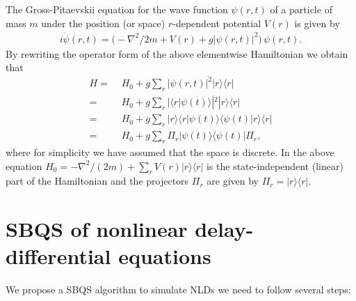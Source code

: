 \documentclass[aps,pra,twocolumn,floatfix,groupedaddress,superscriptaddress,nofootinbib,notitlepage]{revtex4-2}
\begin{document}
The Gross-Pitaevskii equation for the wave function $\psi(r,t)$ of a particle of mass $m$ under the position (or space) $r$-dependent potential $V(r)$ is given by 
\begin{align}
i\dot{\psi}(r,t)= \big(-\nabla^{2}/2m+V(r)+g |\psi(r,t)|^{2}\big) \,\psi(r,t).
\end{align}
By rewriting the operator form of the above elementwise Hamiltonian we obtain that 
\begin{align}
H=&\,\,  H_{0} + g \textstyle{\sum_{r}} |\psi(r,t)|^{2} |r\rangle\langle r|\nonumber\\
=& \,\, H_{0} + g \textstyle{\sum_{r}} |\langle r|\psi(t)\rangle|^{2} |r\rangle\langle r|\nonumber\\
=& \,\, H_{0} + g \textstyle{\sum_{r}} |r\rangle\langle r|\psi(t)\rangle\langle \psi(t)|r\rangle\langle r|\nonumber\\
=& \,\,  H_{0} + g \textstyle{\sum_{r}} \Pi_{r} |\psi(t)\rangle\langle \psi(t)| \Pi_{r},
\end{align}
where for simplicity we have assumed that the space is discrete. In the above equation $H_{0} = -\nabla^{2}/(2m)+\sum_{r}  V(r) |r\rangle\langle r|$ is the state-independent (linear) part of the Hamiltonian and the projectors $\Pi_{r} $ are given by $\Pi_{r} = |r \rangle\langle r|$.

\section{SBQS of nonlinear delay-differential equations}

We propose a SBQS algorithm to simulate NLDs we need to follow several steps:\\
\end{document}
